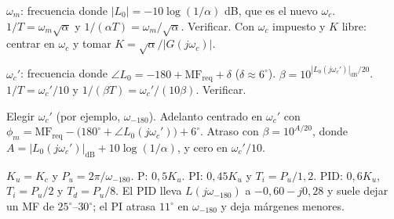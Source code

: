 \documentclass[11pt,a4paper]{article}
\newcounter{ejemplo}
\newcommand{\MF}{\mathrm{MF}}
\newcommand{\wc}{\omega_c}
\newcommand{\wf}{\omega_{-180}}
\begin{document}
{\begin{tcolorbox}[base,colback=white,colframe=verde,title={Adelanto: $G_c=K\frac{Ts+1}{\alpha Ts+1}$\,,\ $\alpha<1$}]
$\omega_m$: frecuencia donde $|L_0|=-10\log(1/\alpha)$ dB, que es el nuevo $\wc$. $1/T=\omega_m\sqrt\alpha$ y $1/(\alpha T)=\omega_m/\sqrt\alpha$. Verificar.
Con $\wc$ impuesto y $K$ libre: centrar en $\wc$ y tomar $K=\sqrt\alpha/|G(j\wc)|$.
\end{tcolorbox}
\begin{tcolorbox}[base,colback=white,colframe=verde,title={Atraso: $G_c=K\frac{Ts+1}{\beta Ts+1}$\,,\ $\beta>1$}]
$\wc'$: frecuencia donde $\angle L_0=-180+\MF_{\text{req}}+\delta$ ($\delta\approx6^\circ$). $\beta=10^{|L_0(j\wc')|_{\mathrm{dB}}/20}$.
$1/T=\wc'/10$ y $1/(\beta T)=\wc'/(10\beta)$. Verificar.
\end{tcolorbox}
\begin{tcolorbox}[base,colback=white,colframe=verde,title={Atraso-adelanto}]
Elegir $\wc'$ (por ejemplo, $\wf$). Adelanto centrado en $\wc'$ con $\phi_m=\MF_{\text{req}}-\big(180^\circ+\angle L_0(j\wc')\big)+6^\circ$.
Atraso con $\beta=10^{A/20}$, donde $A=|L_0(j\wc')|_{\mathrm{dB}}+10\log(1/\alpha)$, y cero en $\wc'/10$.
\end{tcolorbox}
\begin{tcolorbox}[base,colback=white,colframe=verde,title={Ziegler-Nichols (ganancia última)}]
$K_u=K_c$ y $P_u=2\pi/\wf$. P: $0{,}5K_u$. PI: $0{,}45K_u$ y $T_i=P_u/1{,}2$. PID: $0{,}6K_u$, $T_i=P_u/2$ y $T_d=P_u/8$.
El PID lleva $L(j\wf)$ a $-0{,}60-j0{,}28$ y suele dejar un MF de $25^\circ$--$30^\circ$; el PI atrasa $11^\circ$ en $\wf$ y deja márgenes menores.
\end{tcolorbox}
}
\end{document}
